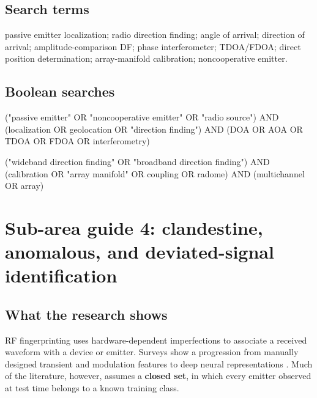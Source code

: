 \documentclass[
  10pt,
]{article}
\newenvironment{Shaded}{}{}
\newcommand{\NormalTok}[1]{#1}
\begin{document}
\subsection{Search terms}\label{search-terms-2}

passive emitter localization; radio direction finding; angle of arrival;
direction of arrival; amplitude-comparison DF; phase interferometer;
TDOA/FDOA; direct position determination; array-manifold calibration;
noncooperative emitter.

\subsection{Boolean searches}\label{boolean-searches-2}

\begin{Shaded}
\begin{Highlighting}[]
\NormalTok{("passive emitter" OR "noncooperative emitter" OR "radio source")}
\NormalTok{AND (localization OR geolocation OR "direction finding")}
\NormalTok{AND (DOA OR AOA OR TDOA OR FDOA OR interferometry)}
\end{Highlighting}
\end{Shaded}

\begin{Shaded}
\begin{Highlighting}[]
\NormalTok{("wideband direction finding" OR "broadband direction finding")}
\NormalTok{AND (calibration OR "array manifold" OR coupling OR radome)}
\NormalTok{AND (multichannel OR array)}
\end{Highlighting}
\end{Shaded}

\section{Sub-area guide 4: clandestine, anomalous, and deviated-signal
identification}\label{sub-area-guide-4-clandestine-anomalous-and-deviated-signal-identification}

\subsection{What the research shows}\label{what-the-research-shows-3}

RF fingerprinting uses hardware-dependent imperfections to associate a
received waveform with a device or emitter. Surveys show a progression
from manually designed transient and modulation features to deep neural
representations \citep{jagannath2022, soltanieh2020}. Much of the
literature, however, assumes a \textbf{closed set}, in which every
emitter observed at test time belongs to a known training class.
\end{document}
